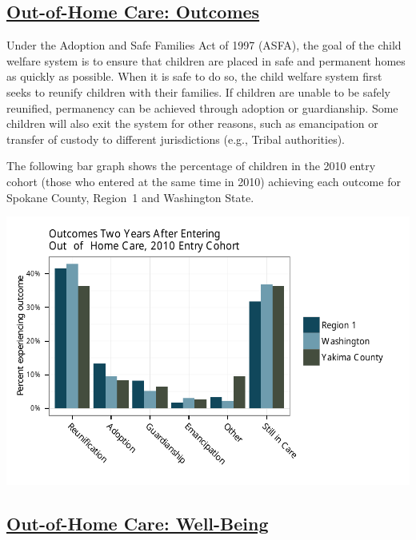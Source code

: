 \documentclass{article}\usepackage[]{graphicx}\usepackage[]{color}
\makeatletter
\def\maxwidth{ %
  \ifdim\Gin@nat@width>\linewidth
    \linewidth
  \else
    \Gin@nat@width
  \fi
}
\newenvironment{knitrout}{}{} %
\makeatother
\begin{document}
\subsection{\href{http://www.partnersforourchildren.org/child-well-being/visualizations/out-home-care/outcomes}
    {Out-of-Home Care: Outcomes}
}
Under the Adoption and Safe Families Act of 1997 (ASFA), the goal of the child welfare system is to ensure that children are placed in safe and permanent homes as quickly as possible. When it is safe to do so, the child welfare system first seeks to reunify children with their families. If children are unable to be safely reunified, permanency can be achieved through adoption or guardianship. Some children will also exit the system for other reasons, such as emancipation or transfer of custody to different jurisdictions (e.g., Tribal authorities).

The following bar graph shows the percentage of children in the 2010 entry cohort (those who entered at the same time in 2010) achieving each outcome for Spokane County, Region~1 and Washington State.
\nopagebreak[3]
\begin{knitrout}
\color{fgcolor}

{\centering \includegraphics[width=\maxwidth]{figure/ooh_outcomes} 

}



\end{knitrout}


\newpage

\subsection{\href{http://www.partnersforourchildren.org/child-well-being/visualizations/out-home-care/well-being}
    {Out-of-Home Care: Well-Being}
}
\end{document}
